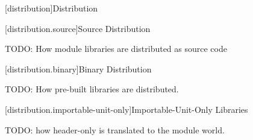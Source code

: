 
[distribution]{Distribution}

%

[distribution.source]{Source Distribution}

\pnum TODO: How module libraries are distributed as source code

[distribution.binary]{Binary Distribution}

\pnum TODO: How pre-built libraries are distributed.

[distribution.importable-unit-only]{Importable-Unit-Only Libraries}

\pnum TODO: how header-only is translated to the module world.

%

